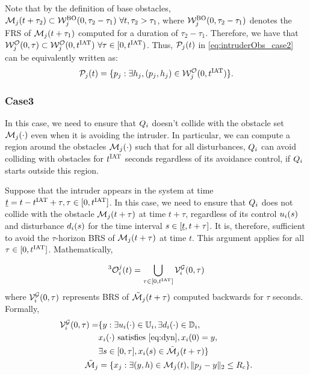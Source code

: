 Note that by the definition of base obstacles, $\mathcal{M}_j(t+\tau_2) \subset \mathcal{W}_{j}^{\text{BO}}(0, \tau_2-\tau_1) ~\forall t, \tau_2 > \tau_1$, where $\mathcal{W}_{j}^{\text{BO}}(0, \tau_2-\tau_1)$ denotes the FRS of $\mathcal{M}_j(t+\tau_1)$ computed for a duration of $\tau_2-\tau_1$. Therefore, we have that $\mathcal{W}_{j}^{\mathcal{O}}(0, \tau) \subset \mathcal{W}_{j}^{\mathcal{O}}(0, t^\text{IAT}) ~\forall \tau \in [0, t^\text{IAT})$. Thus, $\mathcal{P}_j(t)$ in \eqref{eq:intruderObs_case2} can be equivalently written as:
\begin{equation} \label{eq:intruderObs_case2_inter}
\pfrs_j(t) = \{p_j: \exists \npos_j, (p_j, \npos_j) \in \frs_{j}^{\mathcal{O}}(0, \iat) \}.
\end{equation}


\subsubsection{Case3} \label{sec:intruderObs_case3}
In this case, we need to ensure that $Q_i$ doesn't collide with the obstacle set $\mathcal{M}_j(\cdot)$ even when it is avoiding the intruder. In particular, we can compute a region around the obstacles $\mathcal{M}_j(\cdot)$ such that for all disturbances, $Q_i$ can avoid colliding with obstacles for $t^\text{IAT}$ seconds regardless of its avoidance control, if $Q_i$ starts outside this region. 

Suppose that the intruder appears in the system at time $\underline{t} = t - t^\text{IAT} + \tau, \tau \in [0, t^\text{IAT}]$. In this case, we need to ensure that $Q_i$ does not collide with the obstacle $\mathcal{M}_j(t + \tau)$ at time $t + \tau$, regardless of its control $u_i(s)$ and disturbance $d_i(s)$ for the time interval $s \in [\underline{t}, t + \tau]$. It is, therefore, sufficient to avoid the $\tau$-horizon BRS of $\mathcal{M}_j(t + \tau)$ at time $t$. This argument applies for all $\tau \in [0, t^\text{IAT}]$. Mathematically,

\begin{equation} \label{eq:intruderObs_case3}
^3\ioset_i^j(t) = \bigcup_{\tau \in [0, \iat]} \brs^{\mathcal{G}}_{i}(0, \tau)
\end{equation}
where $\mathcal{V}^{\mathcal{G}}_{i}(0, \tau)$ represents BRS of $\tilde{\mathcal{M}}_j(t+\tau)$ computed backwards for $\tau$ seconds. Formally, 
\begin{equation}  \label{eq:ObsBRS_case3}
\begin{aligned}
\brs^{\mathcal{G}}_{i}(0, \tau) = & \{y: \exists \ctrl_i(\cdot) \in \cfset_i, \exists \dstb_i(\cdot) \in \dfset_i, \\
& \state_i(\cdot) \text{ satisfies \eqref{eq:dyn}}, \state_i(0) = y, \\
& \exists s \in [0, \tau], \state_i(s) \in \tilde{\boset}_j(t+\tau)\} \\
\tilde{\boset}_j & = \{\state_j: \exists (y, h) \in \boset_j(t), \|\pos_j - y\|_2 \le \rc \}.
\end{aligned}
\end{equation}

